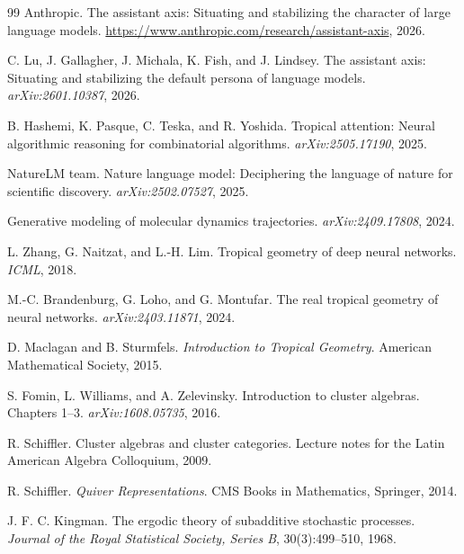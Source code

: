 \documentclass[11pt]{article}
\theoremstyle{definition}
\theoremstyle{plain}
\theoremstyle{remark}
\begin{document}
\begin{thebibliography}{99}
Anthropic.
\newblock The assistant axis: Situating and stabilizing the character of large language models.
\newblock \url{https://www.anthropic.com/research/assistant-axis}, 2026.

C. Lu, J. Gallagher, J. Michala, K. Fish, and J. Lindsey.
\newblock The assistant axis: Situating and stabilizing the default persona of language models.
\newblock \emph{arXiv:2601.10387}, 2026.

B. Hashemi, K. Pasque, C. Teska, and R. Yoshida.
\newblock Tropical attention: Neural algorithmic reasoning for combinatorial algorithms.
\newblock \emph{arXiv:2505.17190}, 2025.

NatureLM team.
\newblock Nature language model: Deciphering the language of nature for scientific discovery.
\newblock \emph{arXiv:2502.07527}, 2025.

\newblock Generative modeling of molecular dynamics trajectories.
\newblock \emph{arXiv:2409.17808}, 2024.

L. Zhang, G. Naitzat, and L.-H. Lim.
\newblock Tropical geometry of deep neural networks.
\newblock \emph{ICML}, 2018.

M.-C. Brandenburg, G. Loho, and G. Montufar.
\newblock The real tropical geometry of neural networks.
\newblock \emph{arXiv:2403.11871}, 2024.

D. Maclagan and B. Sturmfels.
\newblock \emph{Introduction to Tropical Geometry}.
\newblock American Mathematical Society, 2015.

S. Fomin, L. Williams, and A. Zelevinsky.
\newblock Introduction to cluster algebras. Chapters 1--3.
\newblock \emph{arXiv:1608.05735}, 2016.

R. Schiffler.
\newblock Cluster algebras and cluster categories.
\newblock Lecture notes for the Latin American Algebra Colloquium, 2009.

R. Schiffler.
\newblock \emph{Quiver Representations}.
\newblock CMS Books in Mathematics, Springer, 2014.

J. F. C. Kingman.
\newblock The ergodic theory of subadditive stochastic processes.
\newblock \emph{Journal of the Royal Statistical Society, Series B}, 30(3):499--510, 1968.


\end{thebibliography}
\end{document}
